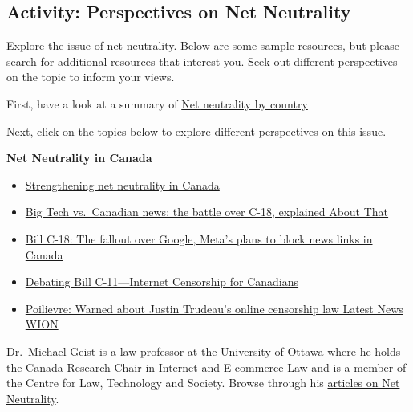 \documentclass[
]{book}
\providecommand{\tightlist}{%
  \setlength{\itemsep}{0pt}\setlength{\parskip}{0pt}}
\theoremstyle{definition}
\theoremstyle{definition}
\theoremstyle{definition}
\theoremstyle{definition}
\theoremstyle{remark}
\begin{document}
\hypertarget{activity-perspectives-on-net-neutrality}{%
\subsection*{Activity: Perspectives on Net Neutrality}\label{activity-perspectives-on-net-neutrality}}

\begin{reflect}
Explore the issue of net neutrality. Below are some sample resources, but please search for additional resources that interest you. Seek out different perspectives on the topic to inform your views.

First, have a look at a summary of \href{https://en.wikipedia.org/wiki/Net_neutrality_by_country\#:~:text=source\%20or\%20ownership.-,China,is\%20available\%20to\%20their\%20citizens}{Net neutrality by country}

Next, click on the topics below to explore different perspectives on this issue.

\textbf{Net Neutrality in Canada}

\begin{itemize}
\tightlist
\item
  \href{https://crtc.gc.ca/eng/internet/diff.htm}{Strengthening net neutrality in Canada}\\
\item
  \href{https://www.youtube.com/watch?v=k5iRopjAwm4}{Big Tech vs.~Canadian news: the battle over C-18, explained \textbar{} About That}\\
\item
  \href{https://www.youtube.com/watch?v=W5YLvCEd1yE}{Bill C-18: The fallout over Google, Meta's plans to block news links in Canada}\\
\item
  \href{https://www.youtube.com/watch?v=bmd4sASKFRw}{Debating Bill C-11---Internet Censorship for Canadians}\\
\item
  \href{https://www.youtube.com/watch?v=doPyNc6Sf_c}{Poilievre: Warned about Justin Trudeau's online censorship law \textbar{} Latest News \textbar{} WION}
\end{itemize}

Dr.~Michael Geist is a law professor at the University of Ottawa where he holds the Canada Research Chair in Internet and E-commerce Law and is a member of the Centre for Law, Technology and Society. Browse through his \href{https://www.michaelgeist.ca/tech-law-topics/net-neutrality/}{articles on Net Neutrality}.


\end{reflect}
\end{document}
